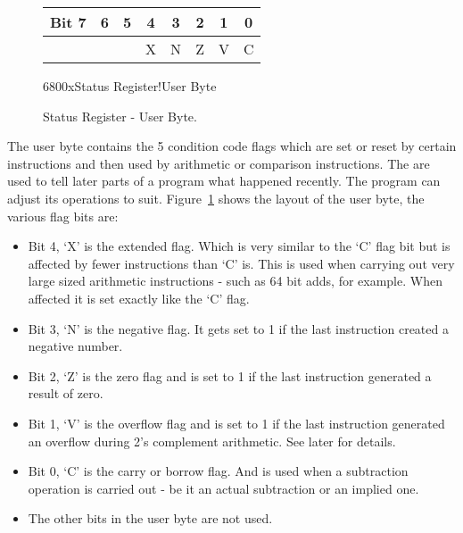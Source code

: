\begin{figure}[h]
\centering
\begin{tabular}{|r|c|c|c|c|c|c|c|}
\hline
Bit 7 & 6 & 5 & 4  & 3 & 2 & 1 & 0 \\
\hline
 & & & X & N & Z & V & C \\
\hline
\end{tabular}

\caption{Status Register -{} User Byte.}\mc6800x{Status Register!User Byte}
\label{fig:StatusRegisterUserByte}
\end{figure}
The user byte contains the 5 condition
        code flags which are set or reset by certain instructions and then
        used by arithmetic or comparison instructions. The are used to tell
        later parts of a program what happened recently. The program can
        adjust its operations to suit. Figure~\ref{fig:StatusRegisterUserByte} shows the layout of the user byte, the various flag bits are:
\begin{itemize}[itemsep=0pt]

\item{}Bit 4, `X' is the extended flag. Which is very similar to
            the `C' flag bit but is affected by fewer instructions than `C'
            is. This is used when carrying out very large sized arithmetic
            instructions -{} such as 64 bit adds, for example. When affected it
            is set exactly like the `C' flag.


\item{}Bit 3, `N' is the negative flag. It gets set to 1 if the
            last instruction created a negative number.


\item{}Bit 2, `Z' is the zero flag and is set to 1 if the last
            instruction generated a result of zero.


\item{}Bit 1, `V' is the overflow flag and is set to 1 if the last
            instruction generated an overflow during 2's complement
            arithmetic. See later for details.


\item{}Bit 0, `C' is the carry or borrow flag. And is used when a
            subtraction operation is carried out -{} be it an actual subtraction
            or an implied one.

\item{}The other bits in the user byte are not used.

 \end{itemize}

